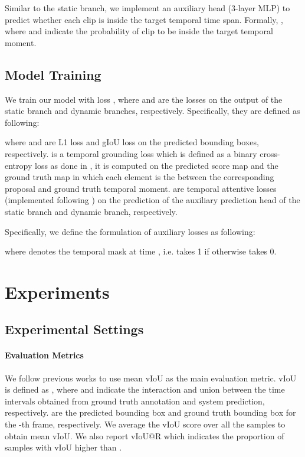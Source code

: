 \documentclass[sigconf]{acmart}
\begin{document}
Similar to the static branch, we implement an auxiliary head (3-layer MLP) to predict whether each clip is inside the target temporal time span. Formally, , where  and  indicate the probability of clip  to be inside the target temporal moment.

\subsection{Model Training}
We train our model with loss , where  and  are the losses on the output of the static branch and dynamic branches, respectively. Specifically, they are defined as following:

where  and  are L1 loss and gIoU loss on the predicted bounding boxes, respectively.  is a temporal grounding loss which is defined as a binary cross-entropy loss as done in \cite{2dtan, Aug2dTAN}, it is computed on the predicted score map  and the ground truth map  in which each element is the  between the corresponding proposal and ground truth temporal moment.  are temporal attentive losses (implemented following \cite{tem_att_loss}) on the prediction of the auxiliary prediction head of the static branch and dynamic branch, respectively.

Specifically, we define the formulation of auxiliary losses as following:

where  denotes the temporal mask at time , i.e.  takes 1 if  otherwise  takes 0.

\section{Experiments}
\label{exp:all}
\subsection{Experimental Settings}
\paragraph{Evaluation Metrics}
We follow previous works\cite{Aug2dTAN, where-dose-it-exist, TubeDETR, STVGBert, HCSTVG_paper} to use mean vIoU as the main evaluation metric. vIoU is defined as , where  and  indicate the interaction and union between the time intervals obtained from ground truth annotation and system prediction, respectively.  are the predicted bounding box and ground truth bounding box for the -th frame, respectively. We average the vIoU score over all the samples to obtain mean vIoU. We also report vIoU@R which indicates the proportion of samples with vIoU higher than . 
\end{document}
